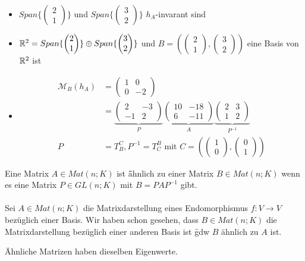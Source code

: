 \begin{itemize}
 \item $Span\{\begin{pmatrix} 2 \\ 1\end{pmatrix}\}$ und $Span\{\begin{pmatrix} 3 \\ 2\end{pmatrix}\}$ $h_A$-invarant sind
 \item $\mathbb{R}^2 = Span\{\begin{pmatrix} 2 \\ 1\end{pmatrix}\} \oplus Span\{\begin{pmatrix} 3 \\ 2\end{pmatrix}\}$ und $B = \left( \begin{pmatrix} 2 \\ 1\end{pmatrix},\begin{pmatrix} 3 \\ 2\end{pmatrix} \right)$ eine Basis von $\mathbb{R}^2$ ist
 \item 
\begin{align}
\mathcal{M}_B (h_A) &= \begin{pmatrix} 1 & 0 \\ 0 & -2\end{pmatrix} \\
&= \underbrace{\begin{pmatrix} 2 & -3 \\ -1 & 2\end{pmatrix}}_{P} \underbrace{\begin{pmatrix} 10 & -18 \\ 6 & -11\end{pmatrix}}_{A} \underbrace{\begin{pmatrix} 2 & 3 \\ 1 & 2\end{pmatrix}}_{P^{-1}} \\
P &= T_{B}^{C}, P^{-1} = T_{C}^{B} \text{ mit } C = \left( \begin{pmatrix} 1 \\ 0 \end{pmatrix}, \begin{pmatrix} 0 \\ 1 \end{pmatrix}\right)
\end{align}
\end{itemize}
Eine Matrix $A \in Mat(n;K)$ ist \f{ähnlich} zu einer Matrix $B \in Mat(n;K)$ wenn es eine Matrix $P \in GL(n;K)$ mit $B = PAP^{-1}$ gibt. \\\\
Sei $A \in Mat(n;K)$ die Matrixdarstellung eines Endomorphismus $f: V \rightarrow V$ bezüglich einer Basis. Wir haben schon gesehen, dass $B \in Mat(n;K)$ die Matrixdarstellung bezüglich einer anderen Basis ist \f{gdw} $B$ ähnlich zu $A$ ist.
\label{lemma221}
\begin{lemma} %

Ähnliche Matrizen haben dieselben Eigenwerte.
\end{lemma}
